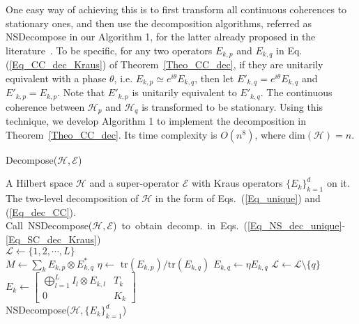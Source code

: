 \documentclass[journal]{IEEEtran}
\def\h{\ensuremath{\mathcal{H}}}
\def\l{\ensuremath{\mathcal{L}}}
\def\k{\ensuremath{\mathcal{K}}}
\def\b{\ensuremath{\mathcal{B}}}
\def\e{\ensuremath{\mathcal{E}}}
\def\l{\ensuremath{\mathcal{L}}}
\def\l{\mathcal{L}}
\def\k{\mathcal{K}}
\begin{document}
One easy way of achieving this is to first transform all continuous coherences to stationary ones, and then use the decomposition algorithms, referred as NSDecompose in our Algorithm 1, for the latter already proposed in the literature~\cite{guan2016decomposition,knill2006protected,wang2013numerical}. To be specific, for any two operators $E_{k,p}$ and $E_{k,q}$ in Eq. (\ref{Eq_CC_dec_Kraus}) of Theorem~\ref{Theo_CC_dec}, if they are unitarily equivalent with a phase $\theta$, i.e. $E_{k,p}\simeq e^{i\theta}E_{k,q}$, then 
 let $E'_{k,q}=e^{i\theta}E_{k,q}$ and $E'_{k,p}=E_{k,p}$. Note that $E'_{k,p}$ is unitarily equivalent to $E'_{k,q}$. The continuous coherence between $\h_p$ and $\h_q$ is transformed to be stationary. Using this technique, we develop Algorithm 1 to implement the decomposition in Theorem~\ref{Theo_CC_dec}. Its time complexity is $O(n^8)$, where dim$(\h)=n.$ 
 \begin{algorithm}
\caption{Decompose($\h,\e$)}
\label{Irreducibility}
\begin{algorithmic}
\REQUIRE A Hilbert space $\h$ and a super-operator $\e$ with Kraus operators $\{E_{k}\}_{k=1}^{d}$ on it. \\
\ENSURE The two-level decomposition of $\h$ in the form of Eqs.~(\ref{Eq_unique}) and (\ref{Eq_dec_CC}). \\
\vspace{.5em}
\STATE 
\mbox{Call NSDecompose($\h,\e$) to obtain decomp. in Eqs.~(\ref{Eq_NS_dec_unique}-\ref{Eq_SC_dec_Kraus})}\\

\STATE $\l\leftarrow \{1,2,\cdots,L\}$\\
\IF{$p\in \l$}
\FOR{each $q$ from  $p+1 \textrm{ to }L$ with $q\in \l$}
\STATE$M\leftarrow\sum_{k}E_{k,p}\otimes E_{k,q}^{*}$
\STATE $\eta\leftarrow$ $\textrm{tr}(E_{k,p})/\textrm{tr}(E_{k,q})$  
\STATE $E_{k,q}\leftarrow \eta E_{k,q}$
\STATE $\l\leftarrow \l\setminus\{q\}$
\ENDIF
\ENDFOR
\ENDIF
\ENDFOR
{}
\STATE $E_k\leftarrow\left[\begin{matrix}
  \bigoplus_{l=1}^{L} I_{l}\otimes E_{k,l} & T_k\\
0&K_k
\end{matrix}\right]$ 
\ENDFOR\\
\RETURN NSDecompose($\h,\{E_{k}\}_{k=1}^d$)
\end{algorithmic}
\end{algorithm}
\end{document}
